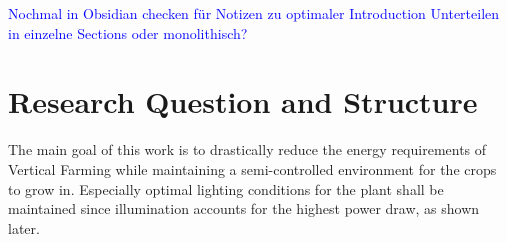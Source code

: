 


\textcolor{blue}{Nochmal in Obsidian checken für Notizen zu optimaler Introduction}
\textcolor{blue}{Unterteilen in einzelne Sections oder monolithisch?}


\section{Research Question and Structure}
The main goal of this work is to drastically reduce the energy requirements of Vertical Farming while maintaining a semi-controlled environment for the crops to grow in.
Especially optimal lighting conditions for the plant shall be maintained since illumination accounts for the highest power draw, as shown later.

